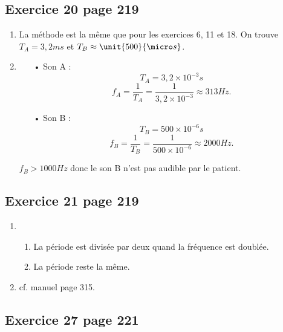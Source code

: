 \documentclass[12pt,a4paper,fleqn]{article}
\begin{document}
\subsection*{Exercice 20 page 219}

\begin{enumerate}
\item La méthode est la même que pour les exercices 6, 11 et 18.
On trouve $T_A = \unit{3{,}2}{ms}$ et $T_B \approx \unit{500}{\micro s}$.
\item 
\begin{multicols}{2}
\begin{itemize}
\item[•] Son A :
\[T_A = \unit{3{,}2\times10^{-3}}{s}\]
\[f_A = \frac{1}{T_A} = \frac{1}{3{,}2\times10^{-3}} \approx \unit{313}{Hz}.\]
\item[•] Son B :
\[T_B = \unit{500\times10^{-6}}{s}\]
\[f_B = \frac{1}{T_B} = \frac{1}{500\times10^{-6}} \approx \unit{2000}{Hz}.\]
\end{itemize}
\end{multicols}
$f_B > \unit{1000}{Hz}$ donc le son B n'est pas audible par le patient.
\end{enumerate}

\subsection*{Exercice 21 page 219}

\begin{enumerate}
\item
\begin{enumerate}
\item La période est divisée par deux quand la fréquence est doublée.
\item La période reste la même.
\end{enumerate}
\item cf. manuel page 315.
\end{enumerate}

\subsection*{Exercice 27 page 221}
\end{document}
